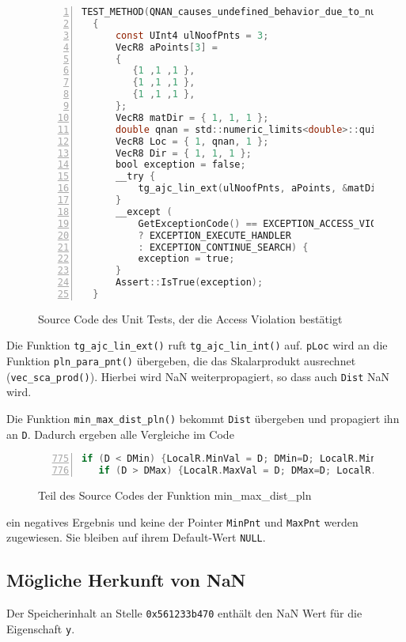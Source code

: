 \begin{figure}[H]
\begin{lstlisting}[language=C,  numbers=left]
  TEST_METHOD(QNAN_causes_undefined_behavior_due_to_nullpointer_dereferencing)
  {
      const UInt4 ulNoofPnts = 3;
      VecR8 aPoints[3] =
      {
         {1 ,1 ,1 },
         {1 ,1 ,1 },
         {1 ,1 ,1 },
      };
      VecR8 matDir = { 1, 1, 1 };
      double qnan = std::numeric_limits<double>::quiet_NaN();
      VecR8 Loc = { 1, qnan, 1 };
      VecR8 Dir = { 1, 1, 1 };
      bool exception = false;
      __try {
          tg_ajc_lin_ext(ulNoofPnts, aPoints, &matDir, &Loc, &Dir, True, True);
      }
      __except (
          GetExceptionCode() == EXCEPTION_ACCESS_VIOLATION
          ? EXCEPTION_EXECUTE_HANDLER
          : EXCEPTION_CONTINUE_SEARCH) {
          exception = true;
      }
      Assert::IsTrue(exception);
  }
\end{lstlisting}
\caption{Source Code des Unit Tests, der die Access Violation bestätigt}
\end{figure}

Die Funktion \verb|tg_ajc_lin_ext()| ruft \verb|tg_ajc_lin_int()| auf. \verb|pLoc| wird an die Funktion \verb|pln_para_pnt()| übergeben, die das Skalarprodukt ausrechnet (\verb|vec_sca_prod()|).
Hierbei wird NaN weiterpropagiert, so dass auch \verb|Dist| NaN wird.

Die Funktion \verb|min_max_dist_pln()| bekommt \verb|Dist| übergeben und propagiert ihn an \verb|D|. Dadurch ergeben alle Vergleiche im Code

\begin{figure}[H]
\begin{lstlisting}[language=C, numbers=left, firstnumber=775]
   if (D < DMin) {LocalR.MinVal = D; DMin=D; LocalR.MinPnt = &aPoints[i];}
   if (D > DMax) {LocalR.MaxVal = D; DMax=D; LocalR.MaxPnt = &aPoints[i];} 
\end{lstlisting}
\caption{Teil des Source Codes der Funktion min\_max\_dist\_pln}
\end{figure}

ein negatives Ergebnis und keine der Pointer \verb|MinPnt| und \verb|MaxPnt| werden zugewiesen. Sie bleiben auf ihrem Default-Wert \verb|NULL|.

\subsection{Mögliche Herkunft von NaN}

Der Speicherinhalt an Stelle \verb|0x561233b470| enthält den NaN Wert für die Eigenschaft \verb|y|.

